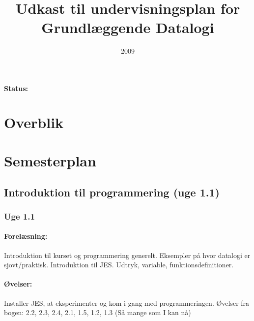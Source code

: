 \documentclass[12pt]{article}
\title{Udkast til undervisningsplan for \\Grundlæggende Datalogi}
\date{2009}
\begin{document}
\maketitle

\paragraph{Status:}


\setcounter{tocdepth}{2}
\tableofcontents
\section{Overblik}

\section{Semesterplan}
\subsection{Introduktion til programmering (uge 1.1)}

\subsubsection{Uge 1.1}

\paragraph{Forelæsning:} 
Introduktion til kurset og programmering generelt.
Eksempler på hvor datalogi er sjovt/praktisk.
Introduktion til JES. 
Udtryk, variable, funktionsdefinitioner.

\paragraph{Øvelser:}
Installer JES, at eksperimenter og kom i gang med programmeringen.
Øvelser fra bogen: 2.2, 2.3, 2.4, 2.1, 1.5, 1.2, 1.3 (Så mange som I kan nå)
\end{document}
